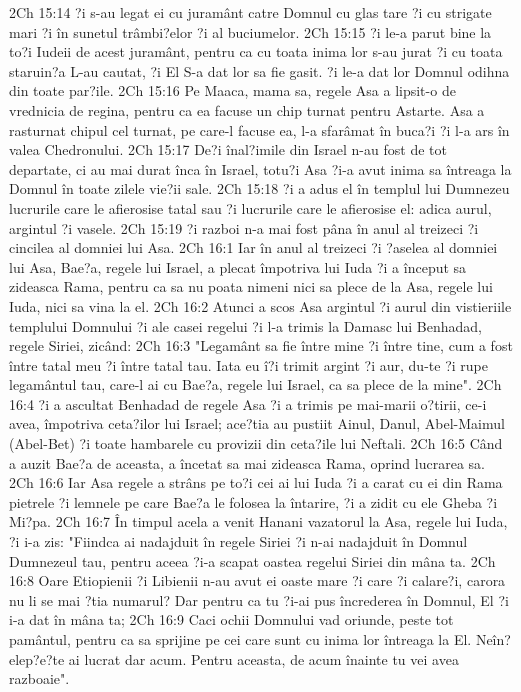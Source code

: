 2Ch 15:14  ?i s-au legat ei cu juramânt catre Domnul cu glas tare ?i cu strigate mari ?i în sunetul trâmbi?elor ?i al buciumelor.
2Ch 15:15  ?i le-a parut bine la to?i Iudeii de acest juramânt, pentru ca cu toata inima lor s-au jurat ?i cu toata staruin?a L-au cautat, ?i El S-a dat lor sa fie gasit. ?i le-a dat lor Domnul odihna din toate par?ile.
2Ch 15:16  Pe Maaca, mama sa, regele Asa a lipsit-o de vrednicia de regina, pentru ca ea facuse un chip turnat pentru Astarte. Asa a rasturnat chipul cel turnat, pe care-l facuse ea, l-a sfarâmat în buca?i ?i l-a ars în valea Chedronului.
2Ch 15:17  De?i înal?imile din Israel n-au fost de tot departate, ci au mai durat înca în Israel, totu?i Asa ?i-a avut inima sa întreaga la Domnul în toate zilele vie?ii sale.
2Ch 15:18  ?i a adus el în templul lui Dumnezeu lucrurile care le afierosise tatal sau ?i lucrurile care le afierosise el: adica aurul, argintul ?i vasele.
2Ch 15:19  ?i razboi n-a mai fost pâna în anul al treizeci ?i cincilea al domniei lui Asa.
2Ch 16:1  Iar în anul al treizeci ?i ?aselea al domniei lui Asa, Bae?a, regele lui Israel, a plecat împotriva lui Iuda ?i a început sa zideasca Rama, pentru ca sa nu poata nimeni nici sa plece de la Asa, regele lui Iuda, nici sa vina la el.
2Ch 16:2  Atunci a scos Asa argintul ?i aurul din vistieriile templului Domnului ?i ale casei regelui ?i l-a trimis la Damasc lui Benhadad, regele Siriei, zicând:
2Ch 16:3  "Legamânt sa fie între mine ?i între tine, cum a fost între tatal meu ?i între tatal tau. Iata eu î?i trimit argint ?i aur, du-te ?i rupe legamântul tau, care-l ai cu Bae?a, regele lui Israel, ca sa plece de la mine".
2Ch 16:4  ?i a ascultat Benhadad de regele Asa ?i a trimis pe mai-marii o?tirii, ce-i avea, împotriva ceta?ilor lui Israel; ace?tia au pustiit Ainul, Danul, Abel-Maimul (Abel-Bet) ?i toate hambarele cu provizii din ceta?ile lui Neftali.
2Ch 16:5  Când a auzit Bae?a de aceasta, a încetat sa mai zideasca Rama, oprind lucrarea sa.
2Ch 16:6  Iar Asa regele a strâns pe to?i cei ai lui Iuda ?i a carat cu ei din Rama pietrele ?i lemnele pe care Bae?a le folosea la întarire, ?i a zidit cu ele Gheba ?i Mi?pa.
2Ch 16:7  În timpul acela a venit Hanani vazatorul la Asa, regele lui Iuda, ?i i-a zis: "Fiindca ai nadajduit în regele Siriei ?i n-ai nadajduit în Domnul Dumnezeul tau, pentru aceea ?i-a scapat oastea regelui Siriei din mâna ta.
2Ch 16:8  Oare Etiopienii ?i Libienii n-au avut ei oaste mare ?i care ?i calare?i, carora nu li se mai ?tia numarul? Dar pentru ca tu ?i-ai pus încrederea în Domnul, El ?i i-a dat în mâna ta;
2Ch 16:9  Caci ochii Domnului vad oriunde, peste tot pamântul, pentru ca sa sprijine pe cei care sunt cu inima lor întreaga la El. Neîn?elep?e?te ai lucrat dar acum. Pentru aceasta, de acum înainte tu vei avea razboaie".

